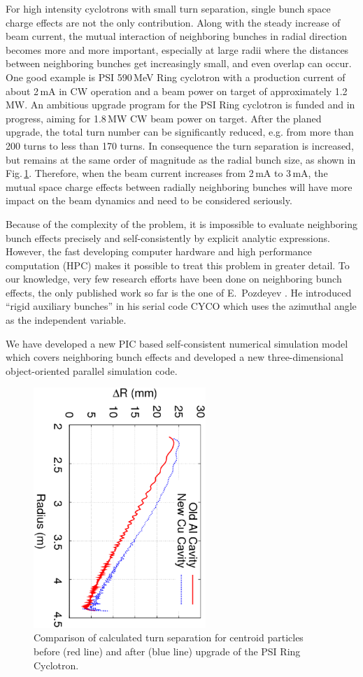 \documentclass{JAC2003}
\begin{document}
For high intensity cyclotrons with small turn separation, single bunch space charge effects are not the only contribution. 
Along with the steady increase of beam current, the mutual interaction of neighboring bunches in radial direction 
becomes more and more important, especially at large radii where the distances between neighboring bunches get increasingly small, and even overlap can occur.
One good example is PSI 590\,MeV Ring cyclotron \cite{Mike:1} with a production current of about 2\,mA in CW operation and a beam power on target of approximately 1.2\,MW.
An ambitious upgrade program for the PSI Ring cyclotron is funded and in progress, aiming for 1.8\,MW CW beam power on target. 
After the planed upgrade, the total turn number can be significantly reduced, e.g. from more than 200 turns to less than 
170 turns.
In consequence the turn separation is increased, but remains at the same order of magnitude as the radial bunch size, as shown in Fig.\,\ref{fig:TuneSep}.
Therefore, when the beam current increases from 2\,mA to 3\,mA, 
the mutual space charge effects between radially neighboring bunches will have more impact on the beam dynamics and need to be considered seriously.

Because of the complexity of the problem, it is impossible to evaluate neighboring bunch effects precisely and self-consistently by explicit 
analytic expressions. However, the fast developing computer hardware and high performance computation (HPC) makes it possible to 
treat this problem in greater detail. To our knowledge, very few research efforts have been done on neighboring bunch effects, the only published work so far is the one of   
E.\ Pozdeyev \cite{Poz:1}. He introduced ``rigid auxiliary bunches'' in his serial code CYCO which uses the azimuthal angle as the independent variable.

We have developed a new PIC based self-consistent numerical simulation model which covers neighboring bunch effects 
and developed a new three-dimensional object-oriented parallel simulation code.  

\begin{figure}
  \centering \includegraphics[width=65mm, angle=90]{figures/R_dR_Ring.ps}
  \caption{Comparison of calculated turn separation for centroid particles before (red line) and after (blue line) upgrade of the PSI Ring Cyclotron.}
  \label{fig:TuneSep}
\end{figure}
\end{document}
